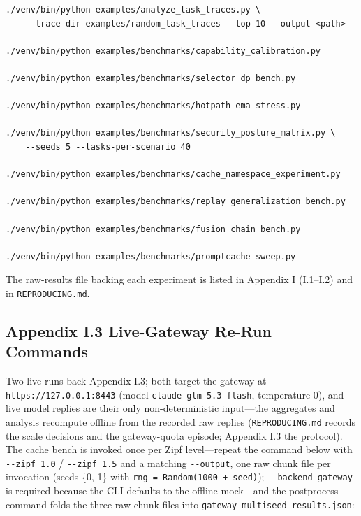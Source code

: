 \documentclass[
  11pt,
]{article}
\begin{document}
\begin{verbatim}
./venv/bin/python examples/analyze_task_traces.py \
    --trace-dir examples/random_task_traces --top 10 --output <path>

./venv/bin/python examples/benchmarks/capability_calibration.py

./venv/bin/python examples/benchmarks/selector_dp_bench.py

./venv/bin/python examples/benchmarks/hotpath_ema_stress.py

./venv/bin/python examples/benchmarks/security_posture_matrix.py \
    --seeds 5 --tasks-per-scenario 40

./venv/bin/python examples/benchmarks/cache_namespace_experiment.py

./venv/bin/python examples/benchmarks/replay_generalization_bench.py

./venv/bin/python examples/benchmarks/fusion_chain_bench.py

./venv/bin/python examples/benchmarks/promptcache_sweep.py
\end{verbatim}

The raw-results file backing each experiment is listed in Appendix I
(I.1--I.2) and in \texttt{REPRODUCING.md}.

\subsection{Appendix I.3 Live-Gateway Re-Run
Commands}\label{appendix-i.3-live-gateway-re-run-commands}

Two live runs back Appendix I.3; both target the gateway at
\texttt{https://127.0.0.1:8443} (model \texttt{claude-glm-5.3-flash},
temperature 0), and live model replies are their only non-deterministic
input---the aggregates and analysis recompute offline from the recorded
raw replies (\texttt{REPRODUCING.md} records the scale decisions and the
gateway-quota episode; Appendix I.3 the protocol). The cache bench is
invoked once per Zipf level---repeat the command below with
\texttt{-\/-zipf\ 1.0} / \texttt{-\/-zipf\ 1.5} and a matching
\texttt{-\/-output}, one raw chunk file per invocation (seeds \{0, 1\}
with \texttt{rng\ =\ Random(1000\ +\ seed)});
\texttt{-\/-backend\ gateway} is required because the CLI defaults to
the offline mock---and the postprocess command folds the three raw chunk
files into \texttt{gateway\_multiseed\_results.json}:
\end{document}
